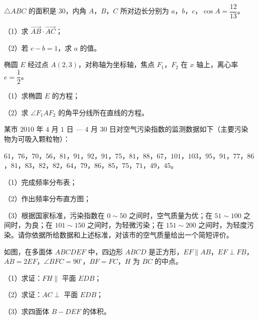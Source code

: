 \begin{question}
$\triangle ABC$ 的面积是 $30$，内角 $A$，$B$，$C$ 所对边长分别为 $a$，$b$，$c$，$\cos A=\dfrac{12}{13}$。

（1）求 $\overrightarrow{AB}\cdot\overrightarrow{AC}$；

（2）若 $c-b=1$，求 $a$ 的值。

\Needspace{0.4\textheight}
\end{question}
\begingroup
\renewenvironment{question}{\Needspace{0.5\textheight}}{}
\begin{question}
椭圆 $E$ 经过点 $A(2,3)$，对称轴为坐标轴，焦点 $F_1$，$F_2$ 在 $x$ 轴上，离心率 $e=\dfrac12$。

（1）求椭圆 $E$ 的方程；

（2）求 $\angle F_1AF_2$ 的角平分线所在直线的方程。
\nopagebreak[4]
\begin{center}\end{center}
\nopagebreak[4]
\end{question}
\endgroup
\begin{question}
某市 $2010$ 年 $4$ 月 $1$ 日 — $4$ 月 $30$ 日对空气污染指数的监测数据如下（主要污染物为可吸入颗粒物）：

$61$，$76$，$70$，$56$，$81$，$91$，$92$，$91$，$75$，$81$，$88$，$67$，$101$，$103$，$95$，$91$，$77$，$86$，$81$，$83$，$82$，$82$，$64$，$79$，$86$，$85$，$75$，$71$，$49$，$45$。

（1）完成频率分布表；

（2）作出频率分布直方图；

（3）根据国家标准，污染指数在 $0\sim50$ 之间时，空气质量为优；在 $51\sim100$ 之间时，为良；在 $101\sim150$ 之间时，为轻微污染；在 $151\sim200$ 之间时，为轻度污染。请你依据所给数据和上述标准，对该市的空气质量给出一个简短评价。

\Needspace{0.4\textheight}
\end{question}
\begingroup
\renewenvironment{question}{\Needspace{0.5\textheight}}{}
\begin{question}
如图，在多面体 $ABCDEF$ 中，四边形 $ABCD$ 是正方形，$EF\parallel AB$，$EF\perp FB$，$AB=2EF$，$\angle BFC=90^\circ$，$BF=FC$，$H$ 为 $BC$ 的中点。

（1）求证：$FH\parallel$ 平面 $EDB$；

（2）求证：$AC\perp$ 平面 $EDB$；

（3）求四面体 $B-DEF$ 的体积。
\nopagebreak[4]
\begin{center}\end{center}
\nopagebreak[4]
\end{question}
